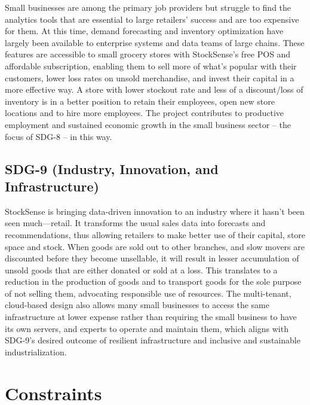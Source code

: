 \documentclass{StockSense}
\begin{document}
Small businesses are among the primary job providers but struggle to find the analytics tools that are essential to large retailers' success and are too expensive for them. At this time, demand forecasting and inventory optimization have largely been available to enterprise systems and data teams of large chains. These features are accessible to small grocery stores with StockSense's free POS and affordable subscription, enabling them to sell more of what's popular with their customers, lower loss rates on unsold merchandise, and invest their capital in a more effective way. A store with lower stockout rate and less of a discount/loss of inventory is in a better position to retain their employees, open new store locations and to hire more employees. The project contributes to productive employment and sustained economic growth in the small business sector – the focus of SDG-8 – in this way.

\subsection{SDG-9 (Industry, Innovation, and Infrastructure)}

StockSense is bringing data-driven innovation to an industry where it hasn't been seen much—retail. It transforms the usual sales data into forecasts and recommendations, thus allowing retailers to make better use of their capital, store space and stock. When goods are sold out to other branches, and slow movers are discounted before they become unsellable, it will result in lesser accumulation of unsold goods that are either donated or sold at a loss. This translates to a reduction in the production of goods and to transport goods for the sole purpose of not selling them, advocating responsible use of resources. The multi-tenant, cloud-based design also allows many small businesses to access the same infrastructure at lower expense rather than requiring the small business to have its own servers, and experts to operate and maintain them, which aligns with SDG-9's desired outcome of resilient infrastructure and inclusive and sustainable industrialization.

\section{Constraints}
\end{document}

